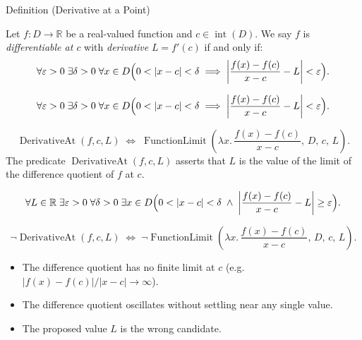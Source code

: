 
\begin{definitionbox}{Definition (Derivative at a Point)}
\begin{definition}
\label{def:derivative-at-a-point}
Let $f: D \to \mathbb{R}$ be a real-valued function and $c \in \operatorname{int}(D)$. We say $f$ is \emph{differentiable at $c$} with \emph{derivative} $L = f'(c)$ if and only if:
\[
\forall \varepsilon > 0 \;\exists \delta > 0 \;\forall x \in D
\Bigl(0 < |x - c| < \delta \implies \left| \frac{f(x) - f(c)}{x - c} - L \right| < \varepsilon\Bigr).
\]
\end{definition}
\end{definitionbox}

\begin{remark*}
\[
\forall \varepsilon > 0 \;\exists \delta > 0 \;\forall x \in D
\Bigl(0 < |x - c| < \delta \implies \left|\frac{f(x)-f(c)}{x-c} - L\right| < \varepsilon\Bigr).
\]
\end{remark*}

\begin{remark*}
\[
\operatorname{DerivativeAt}(f,c,L)
\;\Longleftrightarrow\;
\operatorname{FunctionLimit}\!\left(\lambda x.\,\frac{f(x)-f(c)}{x-c},\,D,\,c,\,L\right).
\]
The predicate $\operatorname{DerivativeAt}(f,c,L)$ asserts that $L$ is the value of the
limit of the difference quotient of $f$ at $c$.
\end{remark*}

\begin{remark*}
\[
\forall L \in \mathbb{R}\;\exists \varepsilon > 0\;\forall \delta > 0\;\exists x \in D
\Bigl(0 < |x-c| < \delta \;\land\; \left|\frac{f(x)-f(c)}{x-c} - L\right| \ge \varepsilon\Bigr).
\]
\end{remark*}

\begin{remark*}
\[
\neg\operatorname{DerivativeAt}(f,c,L)
\;\Longleftrightarrow\;
\neg\operatorname{FunctionLimit}\!\left(\lambda x.\,\frac{f(x)-f(c)}{x-c},\,D,\,c,\,L\right).
\]
\end{remark*}

\begin{remark*}
\begin{itemize}
  \item The difference quotient has no finite limit at $c$ (e.g.\ $|f(x)-f(c)|/|x-c| \to \infty$).
  \item The difference quotient oscillates without settling near any single value.
  \item The proposed value $L$ is the wrong candidate.
\end{itemize}
\end{remark*}

